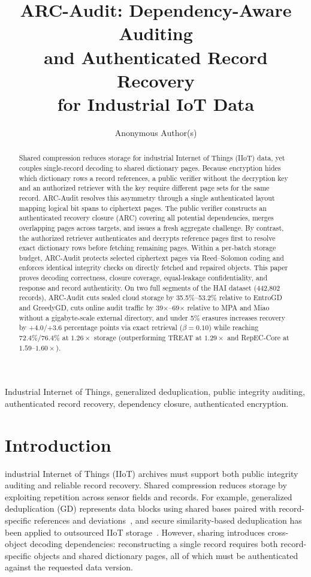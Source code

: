 \documentclass[10pt,journal]{IEEEtran}
\title{ARC-Audit: Dependency-Aware Auditing\\and Authenticated Record Recovery\\for Industrial IoT Data}
\author{Anonymous Author(s)}
\begin{document}
\maketitle
\begin{abstract}
Shared compression reduces storage for industrial Internet of Things (IIoT) data, yet couples single-record decoding to shared dictionary pages. Because encryption hides which dictionary rows a record references, a public verifier without the decryption key and an authorized retriever with the key require different page sets for the same record. ARC-Audit resolves this asymmetry through a single authenticated layout mapping logical bit spans to ciphertext pages. The public verifier constructs an authenticated recovery closure (ARC) covering all potential dependencies, merges overlapping pages across targets, and issues a fresh aggregate challenge. By contrast, the authorized retriever authenticates and decrypts reference pages first to resolve exact dictionary rows before fetching remaining pages. Within a per-batch storage budget, ARC-Audit protects selected ciphertext pages via Reed--Solomon coding and enforces identical integrity checks on directly fetched and repaired objects. This paper proves decoding correctness, closure coverage, equal-leakage confidentiality, and response and record authenticity. On two full segments of the HAI dataset (442,802 records), ARC-Audit cuts sealed cloud storage by 35.5\%--53.2\% relative to EntroGD and GreedyGD, cuts online audit traffic by 39$\times$--69$\times$ relative to MPA and Miao without a gigabyte-scale external directory, and under 5\% erasures increases recovery by +4.0/+3.6 percentage points via exact retrieval ($\beta{=}0.10$) while reaching 72.4\%/76.4\% at $1.26\times$ storage (outperforming TREAT at $1.29\times$ and RepEC-Core at $1.59$--$1.60\times$).
\end{abstract}
\begin{IEEEkeywords}
Industrial Internet of Things, generalized deduplication, public integrity
auditing, authenticated record recovery, dependency closure, authenticated encryption.
\end{IEEEkeywords}

\section{Introduction}\label{sec:introduction}
 industrial Internet of Things (IIoT) archives must support both public integrity auditing and reliable record recovery. Shared compression reduces storage by exploiting repetition across sensor fields and records. For example, generalized deduplication (GD) represents data blocks using shared bases paired with record-specific references and deviations~\cite{Talasila2019}, and secure similarity-based deduplication has been applied to outsourced IIoT storage~\cite{Gao2024}. However, sharing introduces cross-object decoding dependencies: reconstructing a single record requires both record-specific objects and shared dictionary pages, all of which must be authenticated against the requested data version.
\end{document}
